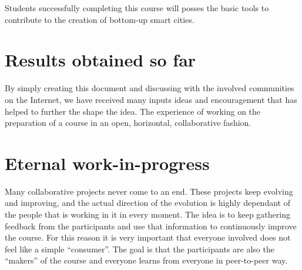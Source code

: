 \documentclass[oneside]{book}   %
\begin{document}
Students successfully completing this course will posses the basic tools to contribute to the creation of bottom-up smart cities.

\section{Results obtained so far}

By simply creating this document and discussing with the involved communities on the Internet, we have received many inputs ideas and encouragement that has helped to further the shape the idea.
The experience of working on the preparation of a course in an open, horizontal, collaborative fashion.

\section{Eternal work-in-progress}

Many collaborative projects never come to an end.
These projects keep evolving and improving, and the actual direction of the evolution is highly dependant of the people that is working in it in every moment.
The idea is to keep gathering feedback from the participants and use that information to continuously improve the course.
For this reason it is very important that everyone involved does not feel like a simple ``consumer''.
The goal is that the participants are also the ``makers'' of the course and everyone learns from everyone in peer-to-peer way.

% 
% 
% 
\end{document}
